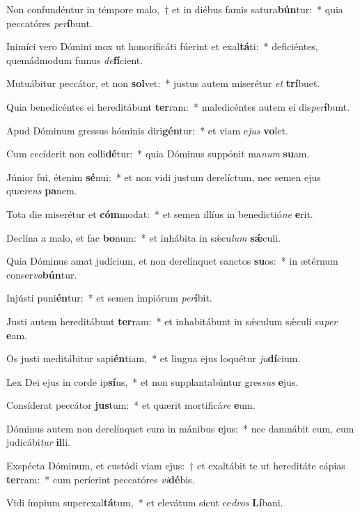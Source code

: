 \item Non confundéntur in témpore malo,~† et in diébus famis satura\textbf{bún}tur:~* quia peccatóres \textit{per}\textbf{í}bunt.
\item Inimíci vero Dómini mox ut honorificáti fúerint et exal\textbf{tá}ti:~* deficiéntes, quemádmodum fumus \textit{de}\textbf{fí}cient.
\item Mutuábitur peccátor, et non \textbf{sol}vet:~* justus autem miserétur \textit{et} \textbf{trí}buet.
\item Quia benedicéntes ei hereditábunt \textbf{ter}ram:~* maledicéntes autem ei dis\textit{per}\textbf{í}bunt.
\item Apud Dóminum gressus hóminis diri\textbf{gén}tur:~* et viam e\textit{jus} \textbf{vo}let.
\item Cum cecíderit non colli\textbf{dé}tur:~* quia Dóminus suppónit ma\textit{num} \textbf{su}am.
\item Júnior fui, étenim \textbf{sé}nui:~* et non vidi justum derelíctum, nec semen ejus quæ\textit{rens} \textbf{pa}nem.
\item Tota die miserétur et \textbf{cóm}modat:~* et semen illíus in benedictió\textit{ne} \textbf{e}rit.
\item Declína a malo, et fac \textbf{bo}num:~* et inhábita in sǽcu\textit{lum} \textbf{sǽ}culi.
\item Quia Dóminus amat judícium, et non derelínquet sanctos \textbf{su}os:~* in ætérnum conser\textit{va}\textbf{bún}tur.
\item Injústi puni\textbf{én}tur:~* et semen impiórum \textit{per}\textbf{í}bit.
\item Justi autem hereditábunt \textbf{ter}ram:~* et inhabitábunt in sǽculum sǽculi su\textit{per} \textbf{e}am.
\item Os justi meditábitur sapi\textbf{én}tiam,~* et lingua ejus loquétur \textit{ju}\textbf{dí}cium.
\item Lex Dei ejus in corde ip\textbf{sí}us,~* et non supplantabúntur gres\textit{sus} \textbf{e}jus.
\item Consíderat peccátor \textbf{jus}tum:~* et quærit mortificá\textit{re} \textbf{e}um.
\item Dóminus autem non derelínquet eum in mánibus \textbf{e}jus:~* nec damnábit eum, cum judicábi\textit{tur} \textbf{il}li.
\item Exspécta Dóminum, et custódi viam ejus:~† et exaltábit te ut hereditáte cápias \textbf{ter}ram:~* cum períerint peccatóres \textit{vi}\textbf{dé}bis.
\item Vidi ímpium superexal\textbf{tá}tum,~* et elevátum sicut ce\textit{dros} \textbf{Lí}bani.
